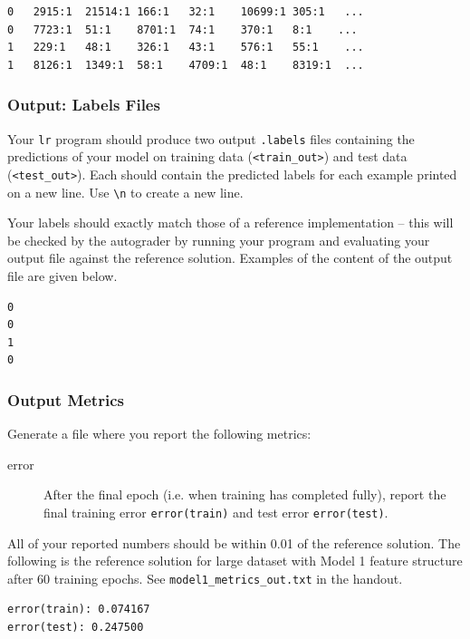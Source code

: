 \documentclass[11pt]{exam}
\numberwithin{equation}{section} %
\numberwithin{figure}{section} %
\numberwithin{table}{section} %
\begin{document}
\begin{lstlisting}
0	2915:1	21514:1	166:1	32:1	10699:1	305:1	...
0	7723:1	51:1	8701:1	74:1	370:1	8:1    ...
1	229:1	48:1	326:1	43:1	576:1	55:1	...
1	8126:1	1349:1	58:1	4709:1	48:1	8319:1	...
\end{lstlisting}


\subsubsection{Output: Labels Files} \label{output}
Your \lstinline{lr} program should produce two output \texttt{.labels} files containing the predictions of your model on training data (\texttt{<train\_out>}) and test data (\texttt{<test\_out>}). Each should contain the predicted labels for each example printed on a new line. Use \lstinline{\n} to create a new line. 

Your labels should exactly match those of a reference implementation -- this will be checked by the autograder by running your program and evaluating your output file against the reference solution. Examples of the content of the output file are given below.

\begin{lstlisting}
0
0
1
0
\end{lstlisting}

\subsubsection{Output Metrics} \label{metrics}
Generate a file where you report the following metrics: 

\begin{description}

\item[error] After the final epoch (i.e. when training has completed fully), report the final training error \newline \lstinline{error(train)} and test error \lstinline{error(test)}. 
\end{description}

All of your reported numbers should be within 0.01 of the reference solution. The following is the reference solution for large dataset with Model 1 feature structure after 60 training epochs. See \newline \lstinline{model1_metrics_out.txt} in the handout.

\begin{lstlisting}
error(train): 0.074167
error(test): 0.247500
\end{lstlisting}
\end{document}
